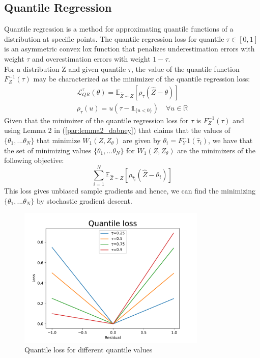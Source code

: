 \subsection{Quantile Regression}
Quantile regression is a method for approximating quantile functions of a distribution at specific points.
The quantile regression loss for quantile $\tau \in [0,1]$ is an asymmetric convex lox function
that penalizes underestimation errors with weight $\tau$ and overestimation errors
with weight $1-\tau$. \\
For a distribution Z and given quantile $\tau$, the value of the quantile function $F_Z^{-1}(\tau)$
may be characterized as the minimizer of the quantile regression loss:
\begin{align}
    \mathcal{L}_{QR}^{\tau}(\theta)=\mathbb E_{\hat{Z}\backsim Z}[\rho_\tau(\hat{Z}-\theta) ] \label{eq:quantile_loss}\\
    \rho_\tau(u)=u(\tau - \mathds{1}_{\{u<0\}}) \quad \forall u \in \mathbb{R} \nonumber
\end{align}
Given that the minimizer of the quantile regression loss for $\tau$ is $F_Z^{-1}(\tau)$ and 
using Lemma 2 in \citet{Dabney2018a} (\ref{par:lemma2_dabney}) that claims that the values 
of $\{\theta_1, ... \theta_N\}$ that minimize
 $W_1(Z,Z_\theta)$ are given by $\theta_i = F_Y^-1(\hat\tau_i)$, we have that the set of minimizing
 values $\{\theta_1, ... \theta_N\}$ for  $W_1(Z,Z_\theta)$ are the minimizers of the 
 following objective:
\begin{equation}
    \sum_{i=1}^{N} \mathbb E_{\hat{Z} \sim Z} [ \rho_{\hat\tau_i}(\hat{Z}-\theta_i)]
\end{equation}
This loss gives unbiased sample gradients and hence, we can find the minimizing $\{\theta_1, ... \theta_N\}$
by stochastic gradient descent.

\begin{figure}[ht] 
    \centering
    \includegraphics[width=0.8\textwidth]{images/quantile_loss.pdf}
    \caption{Quantile loss for different quantile values}
    \label{fig:quantile_loss}
\end{figure}

